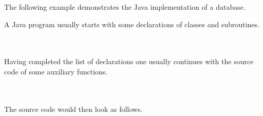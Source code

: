 \documentclass[landscape, slides, light]{mmiss2}[19.02.2002]
\begin{document}
\begin{Package}
\begin{Section}
\begin{Section}[Title={Elements of Formal Specifications},Label=Section1.2]
\begin{Section}[Title={Example for Program},Label=Section1.2.1]
\begin{Paragraph}[Label=para1b]
The following example demonstrates the Java implementation of a
database.
\end{Paragraph}
\begin{Paragraph}[Title={How to begin?},Label=Paragraph1.2.1.1]
A Java program usually starts with some declarations of classes and
subroutines.
\newline
\hfill \\
\hfill \\
\hfill \\
\end{Paragraph}
\begin{Paragraph}[Title={How to proceed?},Label=Paragraph1.2.1.2]
Having completed the list of declarations one usually continues with
the source code of some auxiliary functions.
\newline
\hfill \\
\hfill \\
\hfill \\
\end{Paragraph}
\begin{Paragraph}[Title={The complete program},Label=Paragraph1.2.1.3]
The source code would then look as follows.
\newline
\hfill \\
\hfill \\
\hfill \\
\begin{Program}[Notation=Java_Prog,Label=Program1.2.1.1,Title={(Useless) Database}]
\begin{ProgramFragment}[Notation=Java_Prog,Label=ProgramFragment1.2.1.1.1]
\tiny
\normalsize
\end{ProgramFragment}
\begin{ProgramFragment}[Notation=Java_Prog,Label=ProgramFragment1.2.1.1.2]
\tiny
\normalsize
\end{ProgramFragment}
\begin{ProgramFragment}[Notation=Java_Prog,Label=ProgramFragment1.2.1.1.3]
\tiny
\normalsize
\end{ProgramFragment}
\end{Program}
\end{Paragraph}
\end{Section}


\end{Section}
\end{Section}
\end{Package}
\end{document}

